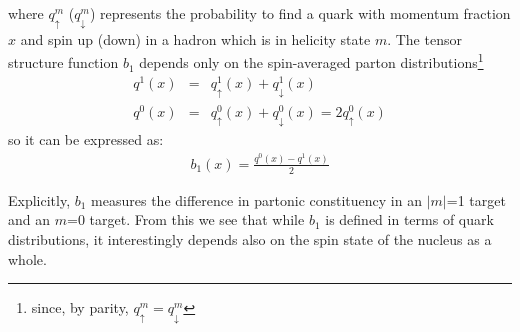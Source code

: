 %
where $q^m_{\uparrow}$ ($q^m_{\downarrow}$)  represents the probability to find a quark with momentum fraction $x$ and spin up (down) in a hadron which is in helicity state $m$.
%
The tensor structure function $b_1$ depends only on the spin-averaged parton distributions\footnote{since, by parity, $q^m_{\uparrow}= q^m_{\downarrow}$} 
\begin{eqnarray*}
q^1(x) &=& q^1_{\uparrow}(x) + q^1_{\downarrow}(x)\\ 
q^0(x) &=& q^0_{\uparrow}(x) + q^0_{\downarrow}(x) 
= 2 q^0_{\uparrow}(x)
\end{eqnarray*}
so it can be expressed as:
\begin{eqnarray}
b_1(x) = \frac{q^0(x) - q^1(x)}{2}
\end{eqnarray}

Explicitly, $b_1$ measures the difference
in partonic constituency in an $|m|$=1 target and an $m$=0 target. 
 From this we see that while $b_1$ is defined in terms of quark distributions, it interestingly depends also on the spin state of the nucleus as a whole.

%
%




